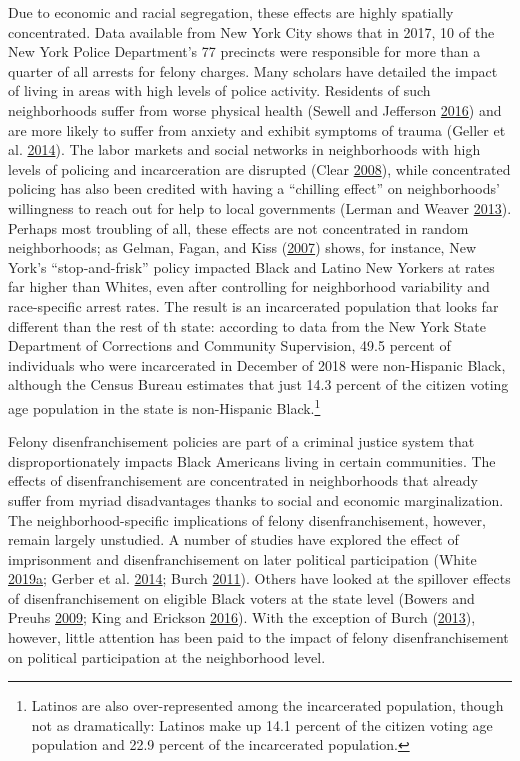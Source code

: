 \documentclass[12pt,]{article}
\let\rmarkdownfootnote\footnote%
\def\footnote{\protect\rmarkdownfootnote}
\begin{document}
Due to economic and racial segregation, these effects are highly spatially concentrated. Data available from New York City shows that in 2017, 10 of the New York Police Department's 77 precincts were responsible for more than a quarter of all arrests for felony charges. Many scholars have detailed the impact of living in areas with high levels of police activity. Residents of such neighborhoods suffer from worse physical health (Sewell and Jefferson \protect\hyperlink{ref-Sewell2016}{2016}) and are more likely to suffer from anxiety and exhibit symptoms of trauma (Geller et al. \protect\hyperlink{ref-Geller2014}{2014}). The labor markets and social networks in neighborhoods with high levels of policing and incarceration are disrupted (Clear \protect\hyperlink{ref-Clear2008}{2008}), while concentrated policing has also been credited with having a ``chilling effect'' on neighborhoods' willingness to reach out for help to local governments (Lerman and Weaver \protect\hyperlink{ref-Lerman2013}{2013}). Perhaps most troubling of all, these effects are not concentrated in random neighborhoods; as Gelman, Fagan, and Kiss (\protect\hyperlink{ref-Gelman2007}{2007}) shows, for instance, New York's ``stop-and-frisk'' policy impacted Black and Latino New Yorkers at rates far higher than Whites, even after controlling for neighborhood variability and race-specific arrest rates. The result is an incarcerated population that looks far different than the rest of th state: according to data from the New York State Department of Corrections and Community Supervision, 49.5 percent of individuals who were incarcerated in December of 2018 were non-Hispanic Black, although the Census Bureau estimates that just 14.3 percent of the citizen voting age population in the state is non-Hispanic Black.\footnote{Latinos are also over-represented among the incarcerated population, though not as dramatically: Latinos make up 14.1 percent of the citizen voting age population and 22.9 percent of the incarcerated population.}

Felony disenfranchisement policies are part of a criminal justice system that disproportionately impacts Black Americans living in certain communities. The effects of disenfranchisement are concentrated in neighborhoods that already suffer from myriad disadvantages thanks to social and economic marginalization. The neighborhood-specific implications of felony disenfranchisement, however, remain largely unstudied. A number of studies have explored the effect of imprisonment and disenfranchisement on later political participation (White \protect\hyperlink{ref-White2019}{2019}\protect\hyperlink{ref-White2019}{a}; Gerber et al. \protect\hyperlink{ref-Gerber2014}{2014}; Burch \protect\hyperlink{ref-Burch2011}{2011}). Others have looked at the spillover effects of disenfranchisement on eligible Black voters at the state level (Bowers and Preuhs \protect\hyperlink{ref-Bowers2009}{2009}; King and Erickson \protect\hyperlink{ref-King2016}{2016}). With the exception of Burch (\protect\hyperlink{ref-Burch2013}{2013}), however, little attention has been paid to the impact of felony disenfranchisement on political participation at the neighborhood level.
\end{document}
